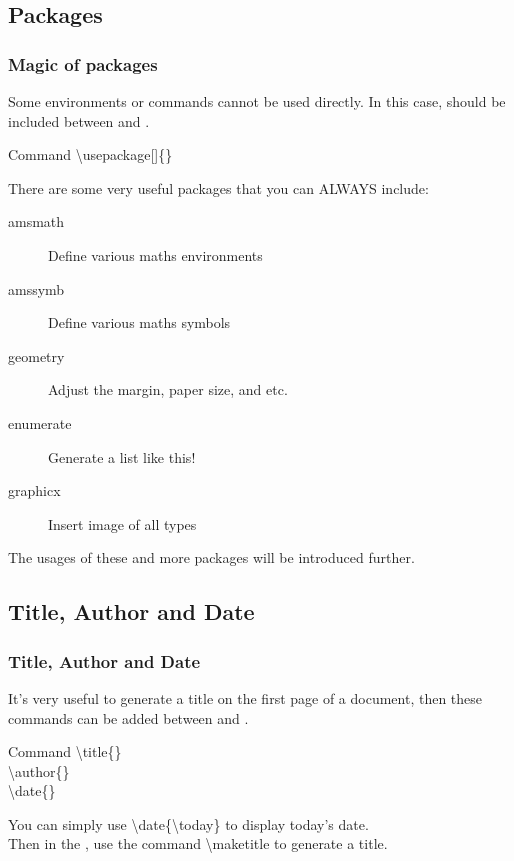 \documentclass{beamer}
\newenvironment{command}{\begin{block}{Command}}{\end{block}}
\newcommand{\samplecommand}[1]{\alert{\textbackslash #1}}
\begin{document}
\subsection{Packages}

\begin{frame}
	\frametitle{Magic of packages}
	Some environments or commands cannot be used directly. In this case,   should be included between  and .
	\begin{command}
		\samplecommand{usepackage}[]\{\}
	\end{command}
	There are some very useful packages that you can \alert{ALWAYS} include:
	\begin{description}
		\item[amsmath] Define various maths environments
		\item[amssymb] Define various maths symbols
		\item[geometry] Adjust the margin, paper size, and etc.
		\item[enumerate] Generate a list like this!
		\item[graphicx] Insert image of all types
	\end{description}
	The usages of these and more packages will be introduced further.
\end{frame}

\subsection{Title, Author and Date}

\begin{frame}
	\frametitle{Title, Author and Date}
	It's very useful to generate a title on the first page of a document, then these commands can be added between  and .
	\begin{command}
		\samplecommand{title}\{\}\\
		\samplecommand{author}\{\}\\
		\samplecommand{date}\{\}\\
	\end{command}
	You can simply use \samplecommand{date}\{\samplecommand{today}\} to display today's date.\\[0.5em]
	Then in the , use the command \samplecommand{maketitle} to generate a title.
\end{frame}
\end{document}
